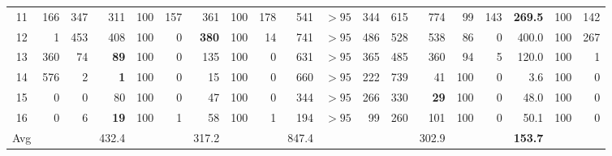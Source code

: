\documentclass[authoryear,preprint,a4paper,12pt]{elsarticle}
\begin{document}
\begin{sidewaystable}
{\begin{tabular}{|c|r|r|rrr|rrr|rrr|r|rrr|rrr|}
11 & 166 & 347 & 311 & 100 & 157 & 361 & 100 & 178 & 541 & $>95$ & 344 & 615 & 774 & 99 & 143 & \textbf{269.5} & 100 & 142 \\ 
12 & 1 & 453 & 408 & 100 & 0 & \textbf{380} & 100 & 14 & 741 & $>95$ & 486 & 528 & 538 & 86 & 0 & 400.0 & 100 & 267 \\ 
13 & 360 & 74 & \textbf{89} & 100 & 0 & 135 & 100 & 0 & 631 & $>95$ & 365 & 485 & 360 & 94 & 5 & 120.0 & 100 & 1 \\ 
14 & 576 & 2 & \textbf{1} & 100 & 0 & 15 & 100 & 0 & 660 & $>95$ & 222 & 739 & 41 & 100 & 0 & 3.6 & 100 & 0 \\ 
15 & 0 & 0 & 80 & 100 & 0 & 47 & 100 & 0 & 344 & $>95$ & 266 & 330 & \textbf{29} & 100 & 0 & 48.0 & 100 & 0 \\ 
16 & 0 & 6 & \textbf{19} & 100 & 1 & 58 & 100 & 1 & 194 & $>95$ & 99 & 260 & 101 & 100 & 0 & 50.1 & 100 & 0 \\ \hline
Avg &  &  & 432.4 &  &  & 317.2 &  &  & 847.4 &  &  &  & 302.9 &  &  & \textbf{153.7} &  &  \\ \hline
\end{tabular}
}



\end{sidewaystable}
\end{document}

